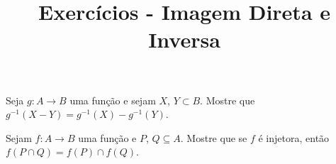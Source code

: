 \documentclass{beamer}
\title{Exercícios - Imagem Direta e Inversa}
\author[\autor]{\autor}
\institute[\instituto]{\instituto}
\date{}
\begin{document}
    \begin{frame}
        \maketitle
    \end{frame}

    
    \begin{frame}
        \begin{exercicio}
            Seja $g : A\to B$ uma fun{\c c}{\~a}o e sejam $X$, $Y\subset B$. Mostre que $g^{-1}(X - Y)= g^{-1}(X) - g^{-1}(Y)$.
        \end{exercicio}

    \end{frame}

    \begin{frame}
        \begin{exercicio}
            Sejam $f : A \to B$ uma fun{\c c}{\~a}o e $P$, $Q \subseteq A$. Mostre que se $f$ \'e injetora, ent{\~a}o $f(P \cap Q) = f(P) \cap f(Q)$.
        \end{exercicio}

    \end{frame}
\end{document}
